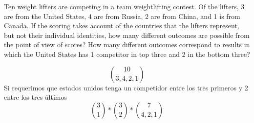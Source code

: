 \item Ten weight lifters are competing in a team weightlifting contest. Of the lifters, 3 are from the United States, 4 are from Russia, 2 are from China, and 1 is from Canada. If the scoring takes account of the countries that the lifters represent, but not their individual identities, how many different outcomes are possible from the point of view of scores? How many different outcomes correspond to results in which the United States has 1 competitor in top three and 2 in the bottom three?

\[ \binom{10}{3,4,2,1} \]
Si requerimos que estados unidos tenga un competidor entre los tres primeros y 2 entre los tres últimos
\[ \binom{3}{1} * \binom{3}{2} * \binom{7}{4,2,1} \]